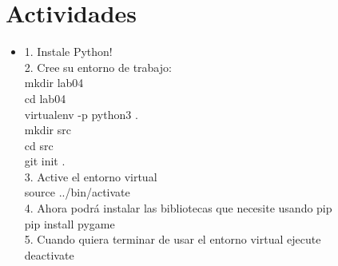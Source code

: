 \documentclass{article}
\begin{document}
	\section{Actividades}
	\begin{itemize}		
		\item 1. Instale Python!\\
		2. Cree su entorno de trabajo:\\
		\hspace*{1cm}	mkdir lab04 \\
		\hspace*{1cm}	cd lab04\\
		\hspace*{1cm}	virtualenv -p python3 .\\
		\hspace*{1cm}	mkdir src\\
		\hspace*{1cm}	cd src\\
		\hspace*{1cm}	git init .\\
		3. Active el entorno virtual\\
		\hspace*{1cm}	source ../bin/activate\\
		4. Ahora podrá instalar las bibliotecas que necesite usando pip\\
		\hspace*{1cm}	pip install pygame\\
		5. Cuando quiera terminar de usar el entorno virtual ejecute\\
		\hspace*{1cm}	deactivate
		
	\end{itemize}
	
\end{document}
